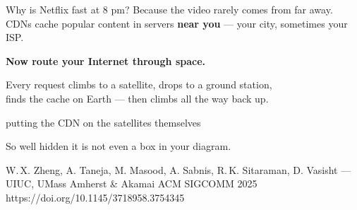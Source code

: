 \begin{frame}{Why is Netflix fast at 8 pm?}
     {Because the video rarely comes from far away. CDNs
       cache popular content in
      servers \textbf{near you} --- your city, sometimes your ISP.}

  \large\textbf{Now route your Internet through space.}

  \vspace{0.1em}
  \small
  Every request climbs to a satellite, drops to a ground station,\\
  finds the cache on Earth --- then climbs all the way back up.

    {putting the CDN on the satellites themselves}

  \vspace{0.1em}
  {\small So well hidden it is not even a box in your diagram.\par}

  \vspace{0.1em}
    {W.\,X. Zheng, A. Taneja, M. Masood, A. Sabnis, R.\,K. Sitaraman,
     D. Vasisht --- UIUC, UMass Amherst \& Akamai}
    {ACM SIGCOMM 2025}
    {https://doi.org/10.1145/3718958.3754345}
\end{frame}

